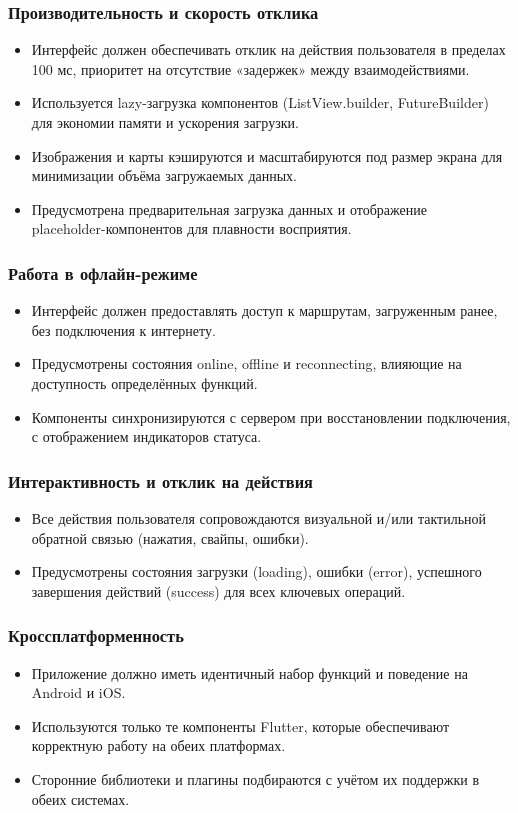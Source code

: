 \subsubsection*{Производительность и скорость отклика}
\begin{itemize}
    \item Интерфейс должен обеспечивать отклик на действия пользователя в пределах 100 мс, приоритет на отсутствие «задержек» между взаимодействиями.
    \item Используется lazy-загрузка компонентов (ListView.builder, FutureBuilder) для экономии памяти и ускорения загрузки.
    \item Изображения и карты кэшируются и масштабируются под размер экрана для минимизации объёма загружаемых данных.
    \item Предусмотрена предварительная загрузка данных и отображение\\ placeholder-компонентов для плавности восприятия.
\end{itemize}

\subsubsection*{Работа в офлайн-режиме}
\begin{itemize}
    \item Интерфейс должен предоставлять доступ к маршрутам, загруженным ранее, без подключения к интернету.
    \item Предусмотрены состояния online, offline и reconnecting, влияющие на доступность определённых функций.
    \item Компоненты синхронизируются с сервером при восстановлении подключения, с отображением индикаторов статуса.
\end{itemize}

\subsubsection*{Интерактивность и отклик на действия}
\begin{itemize}
    \item Все действия пользователя сопровождаются визуальной и/или тактильной обратной связью (нажатия, свайпы, ошибки).
    \item Предусмотрены состояния загрузки (loading), ошибки (error), успешного завершения действий (success) для всех ключевых операций.
\end{itemize}

\subsubsection*{Кроссплатформенность}
\begin{itemize}
    \item Приложение должно иметь идентичный набор функций и поведение на Android и iOS.
    \item Используются только те компоненты Flutter, которые обеспечивают корректную работу на обеих платформах.
    \item Сторонние библиотеки и плагины подбираются с учётом их поддержки в обеих системах.
\end{itemize}

